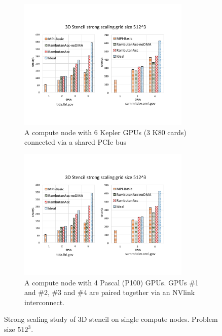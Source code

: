\begin{figure}[htb]
\begin{subfigure}[b]{0.47\textwidth}
\centering
\includegraphics[width=0.9\textwidth]{figures/stencil_single_node_tida.pdf}
\caption{A compute node with 6 Kepler GPUs (3 K80 cards) connected via a shared PCIe bus}
\label{stencil_single_node_tida}
\end{subfigure}
\begin{subfigure}[b]{0.47\textwidth}
\centering
\includegraphics[width=0.9\textwidth]{figures/stencil_single_node_summit.pdf}
\caption{A compute node with 4 Pascal (P100) GPUs. GPUs \#1 and \#2, \#3 and \#4 are paired together via an NVlink interconnect.}
\label{stencil_single_node_summit}
\end{subfigure}
\caption{Strong scaling study of 3D stencil on single compute nodes. Problem size $512^3$.
}
\label{fig:stencil_single_nodes}
\end{figure}

